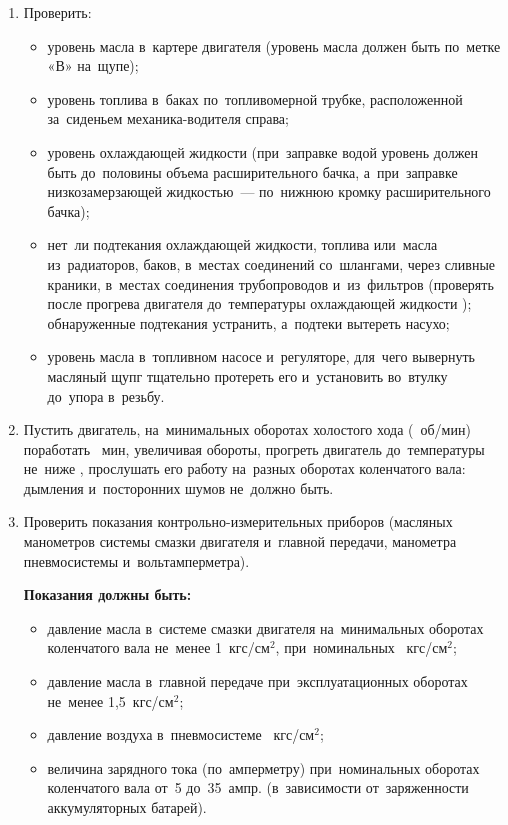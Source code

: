 \begin{enumerate}
    \item Проверить: 
        \begin{itemize}
            \item уровень масла в~картере двигателя (уровень масла должен быть по~метке «В» на~щупе); 
            \item уровень топлива в~баках по~топливомерной трубке, расположенной за~сиденьем механика-водителя справа; 
            \item уровень охлаждающей жидкости (при~заправке водой уровень должен быть до~половины объема расширительного бачка, а~при~заправке низкозамерзающей жидкостью~--- по~нижнюю кромку расширительного бачка); 
            \item нет~ли подтекания охлаждающей жидкости, топлива или~масла из~радиаторов, баков, в~местах соединений со~шлангами, через сливные краники, в~местах соединения трубопроводов и~из~фильтров (проверять после прогрева двигателя до~температуры охлаждающей жидкости ); обнаруженные подтекания устранить, а~подтеки вытереть насухо; 
            \item уровень масла в~топливном насосе и~регуляторе, для~чего вывернуть масляный щупг тщательно протереть его и~установить во~втулку до~упора в~резьбу. 
        \end{itemize}

    \item Пустить двигатель, на~минимальных оборотах холостого хода (~об/мин) поработать ~мин, увеличивая обороты, прогреть двигатель до~температуры не~ниже , прослушать его работу на~разных оборотах коленчатого вала: дымления и~посторонних шумов не~должно быть.
    \item Проверить показания контрольно-измерительных приборов (масляных манометров системы смазки двигателя и~главной передачи, манометра пневмосистемы и~вольтамперметра). 
        
    \textbf{Показания должны быть:}
        \begin{itemize}
            \item давление масла в~системе смазки двигателя на~минимальных оборотах коленчатого вала не~менее 1~кгс/см$^2$, при~номинальных ~кгс/см$^2$; 
            \item давление масла в~главной передаче при~эксплуатационных оборотах не~менее 1,5~кгс/см$^2$; 
            \item давление воздуха в~пневмосистеме ~кгс/см$^2$; 
            \item величина зарядного тока (по~амперметру) при~номинальных оборотах коленчатого вала от~5 до~35~ампр. (в~зависимости от~заряженности аккумуляторных батарей). 
        \end{itemize}
\end{enumerate}


